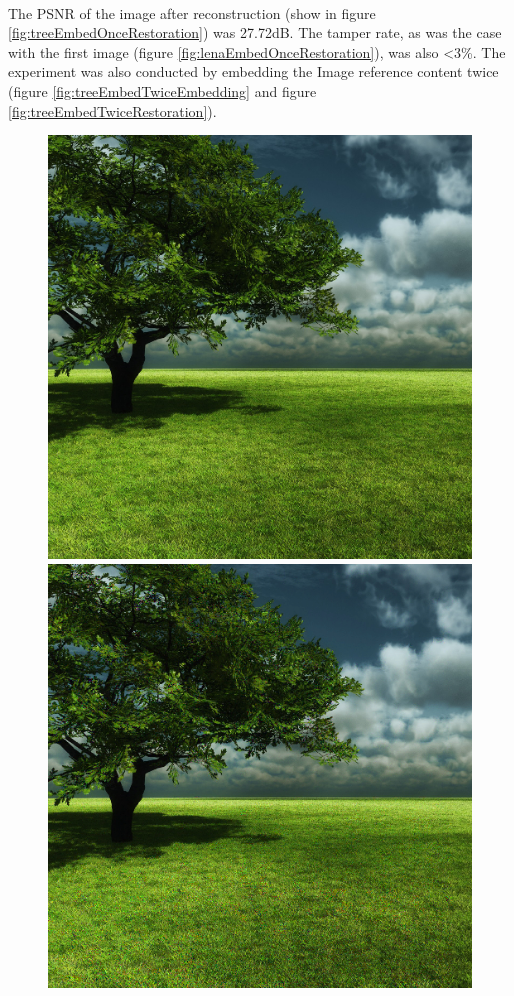 \documentclass[12pt]{article}
\begin{document}
\hspace{0pt} \\
The PSNR of the image after reconstruction (show in figure \ref{fig:treeEmbedOnceRestoration}) was 27.72dB.
The tamper rate, as was the case with the first image (figure \ref{fig:lenaEmbedOnceRestoration}), was also \textless 3\%.
The experiment was also conducted by embedding the Image reference content twice (figure \ref{fig:treeEmbedTwiceEmbedding} and figure \ref{fig:treeEmbedTwiceRestoration}).

\begin{figure}[h]
\centerline{%
\includegraphics[scale=0.3375]{"tree"}%
\hspace{0.1cm}
\includegraphics[scale=0.45]{"Tree Embed twice 0.8 threshold/finalImage"}%
}
\end{figure}
\end{document}
